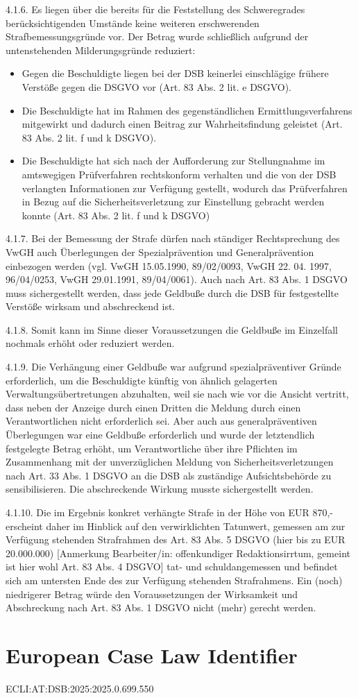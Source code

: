 \documentclass[11pt,a4paper]{article}
\begin{document}
4.1.6. Es liegen über die bereits für die Feststellung des Schweregrades berücksichtigenden Umstände keine weiteren erschwerenden Strafbemessungsgründe vor. Der Betrag wurde schließlich aufgrund der untenstehenden Milderungsgründe reduziert:

\begin{itemize}
\item Gegen die Beschuldigte liegen bei der DSB keinerlei einschlägige frühere Verstöße gegen die DSGVO vor (Art. 83 Abs. 2 lit. e DSGVO).
\item Die Beschuldigte hat im Rahmen des gegenständlichen Ermittlungsverfahrens mitgewirkt und dadurch einen Beitrag zur Wahrheitsfindung geleistet (Art. 83 Abs. 2 lit. f und k DSGVO).
\item Die Beschuldigte hat sich nach der Aufforderung zur Stellungnahme im amtswegigen Prüfverfahren rechtskonform verhalten und die von der DSB verlangten Informationen zur Verfügung gestellt, wodurch das Prüfverfahren in Bezug auf die Sicherheitsverletzung zur Einstellung gebracht werden konnte (Art. 83 Abs. 2 lit. f und k DSGVO)
\end{itemize}

4.1.7. Bei der Bemessung der Strafe dürfen nach ständiger Rechtsprechung des VwGH auch Überlegungen der Spezialprävention und Generalprävention einbezogen werden (vgl. VwGH 15.05.1990, 89/02/0093, VwGH 22. 04. 1997, 96/04/0253, VwGH 29.01.1991, 89/04/0061). Auch nach Art. 83 Abs. 1 DSGVO muss sichergestellt werden, dass jede Geldbuße durch die DSB für festgestellte Verstöße wirksam und abschreckend ist.

4.1.8. Somit kann im Sinne dieser Voraussetzungen die Geldbuße im Einzelfall nochmals erhöht oder reduziert werden.

4.1.9. Die Verhängung einer Geldbuße war aufgrund spezialpräventiver Gründe erforderlich, um die Beschuldigte künftig von ähnlich gelagerten Verwaltungsübertretungen abzuhalten, weil sie nach wie vor die Ansicht vertritt, dass neben der Anzeige durch einen Dritten die Meldung durch einen Verantwortlichen nicht erforderlich sei. Aber auch aus generalpräventiven Überlegungen war eine Geldbuße erforderlich und wurde der letztendlich festgelegte Betrag erhöht, um Verantwortliche über ihre Pflichten im Zusammenhang mit der unverzüglichen Meldung von Sicherheitsverletzungen nach Art. 33 Abs. 1 DSGVO an die DSB als zuständige Aufsichtsbehörde zu sensibilisieren. Die abschreckende Wirkung musste sichergestellt werden.

4.1.10. Die im Ergebnis konkret verhängte Strafe in der Höhe von EUR 870,- erscheint daher im Hinblick auf den verwirklichten Tatunwert, gemessen am zur Verfügung stehenden Strafrahmen des Art. 83 Abs. 5 DSGVO (hier bis zu EUR 20.000.000) [Anmerkung Bearbeiter/in: offenkundiger Redaktionsirrtum, gemeint ist hier wohl Art. 83 Abs. 4 DSGVO] tat- und schuldangemessen und befindet sich am untersten Ende des zur Verfügung stehenden Strafrahmens. Ein (noch) niedrigerer Betrag würde den Voraussetzungen der Wirksamkeit und Abschreckung nach Art. 83 Abs. 1 DSGVO nicht (mehr) gerecht werden.

\section{European Case Law Identifier}

ECLI:AT:DSB:2025:2025.0.699.550
\end{document}
